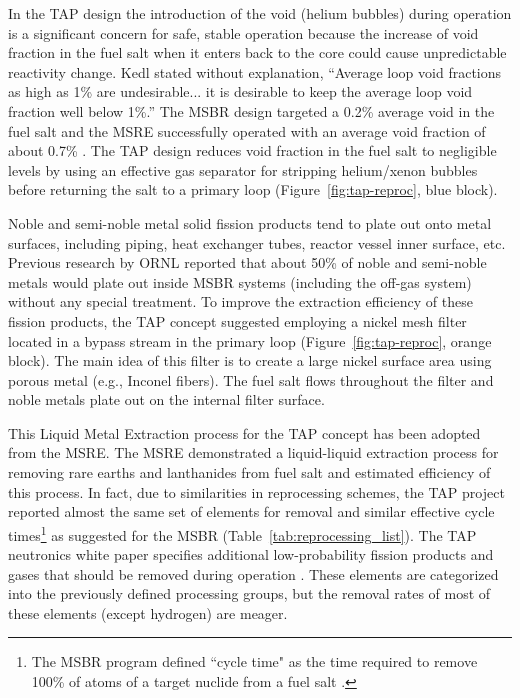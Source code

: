 In the \gls{TAP} design the introduction of the void (helium bubbles) during 
operation is a significant concern for safe, stable operation because the 
increase of void fraction in the fuel salt when it enters back to the core 
could cause unpredictable reactivity change. Kedl stated without explanation, 
``Average loop void fractions as high as 1\% are undesirable... it is 
desirable to keep the average loop void fraction well below 
1\%.''\cite{robertson_conceptual_1971} The \gls{MSBR} design targeted a 0.2\% 
average void in the fuel salt \cite{robertson_conceptual_1971} and the 
\gls{MSRE} successfully operated with an average void fraction of about 0.7\% 
\cite{compere_fission_1975}. The \gls{TAP} design reduces void fraction in the 
fuel salt to negligible levels by using an effective gas separator for 
stripping helium/xenon bubbles before returning the salt to a primary loop 
(Figure~\ref{fig:tap-reproc}, blue block). 

Noble and semi-noble metal solid fission products tend to plate out onto metal 
surfaces, including piping, heat exchanger tubes, reactor vessel inner 
surface, etc. Previous research by \gls{ORNL} \cite{robertson_conceptual_1971} 
reported that about 50\% of noble and semi-noble metals would plate out inside 
\gls{MSBR} systems (including the off-gas system) without any special 
treatment. To improve the extraction efficiency of these fission products, the 
\gls{TAP} concept suggested employing a nickel mesh filter located in a bypass 
stream in the primary loop (Figure~\ref{fig:tap-reproc}, orange block). The 
main idea of this filter is to create a large nickel surface area using porous 
metal (e.g., Inconel fibers). The fuel salt flows throughout the filter 
and noble metals plate out on the internal filter surface. 

This Liquid Metal Extraction process for the \gls{TAP} concept has been 
adopted from the \gls{MSRE}. The \gls{MSRE} demonstrated a liquid-liquid 
extraction process for removing rare earths and lanthanides from fuel salt and 
estimated efficiency of this process. In fact, due to similarities in 
reprocessing schemes, the \gls{TAP} project reported almost the same set of 
elements for removal and similar effective cycle times\footnote{The \gls{MSBR} 
program defined ``cycle time" as the time required to remove 100\% of atoms of 
a target nuclide from a
fuel salt \cite{robertson_conceptual_1971}.
} as 
suggested for the \gls{MSBR} (Table~\ref{tab:reprocessing_list}). The 
\gls{TAP} neutronics white paper specifies additional low-probability fission 
products and gases that should be removed during operation  
\cite{transatomic_power_corporation_neutronics_2016}. These elements are 
categorized into the previously defined processing groups, but the removal 
rates of most of these elements (except hydrogen) are meager.

